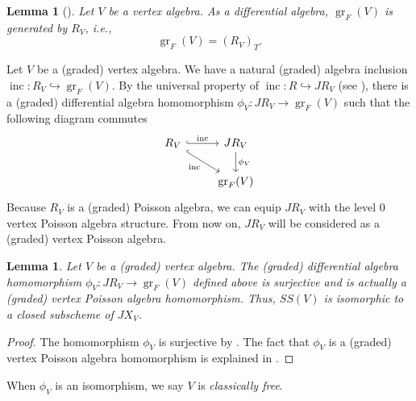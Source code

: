 \documentclass[a4paper, 12pt, reqno]{amsart}
\newtheorem{lemma}[theorem]{Lemma}
\theoremstyle{remark}
\DeclareMathOperator{\gr}{gr}
\DeclareMathOperator{\inc}{inc}
\begin{document}
\begin{lemma}[{\cite[Corollary 4.3]{li_abelianizing_2005}}]
  \label{lmm:25}
  Let $V$ be a vertex algebra.
  As a differential algebra, $\gr_F(V)$ is generated by $R_V$, i.e.,
  \begin{equation*}
    \gr_F(V) = (R_V)_T.
  \end{equation*}
\end{lemma}

Let $V$ be a (graded) vertex algebra.
We have a natural (graded) algebra inclusion $\inc: R_V \hookrightarrow \gr_F(V)$.
By the universal property of $\inc: R \hookrightarrow JR_V$ (see ), there is a (graded) differential algebra homomorphism $\phi_V: JR_V \to \gr_F(V)$ such that the following diagram commutes
\begin{equation*}
  \begin{tikzcd}
    R_V \arrow[rd, "\inc"', hook] \arrow[r, "\inc", hook] & JR_V \arrow[d, "\phi_V"] \\
    & \gr_F(V)
  \end{tikzcd}
\end{equation*}
Because $R_V$ is a (graded) Poisson algebra, we can equip $JR_V$ with the level 0 vertex Poisson algebra structure.
From now on, $JR_V$ will be considered as a (graded) vertex Poisson algebra.

\begin{lemma}
  \label{lmm:26}
  Let $V$ be a (graded) vertex algebra.
  The (graded) differential algebra homomorphism $\phi_V: JR_V \to \gr_F(V)$ defined above is surjective and is actually a (graded) vertex Poisson algebra homomorphism.
  Thus, $SS(V)$ is isomorphic to a closed subscheme of $JX_V$.
\end{lemma}

\begin{proof}
  The homomorphism $\phi_V$ is surjective by .
  The fact that $\phi_V$ is a (graded) vertex Poisson algebra homomorphism is explained in \cite[Proposition 2.5.1]{arakawa_remark_2012}.
\end{proof}

When $\phi_V$ is an isomorphism, we say $V$ is \emph{classically free}.
\end{document}

